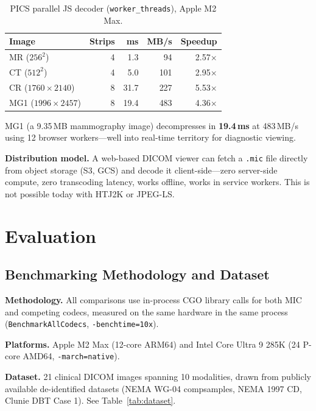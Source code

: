 \documentclass[journal]{IEEEtran}
\begin{document}
\begin{table}[htbp]
\centering
\caption{PICS parallel JS decoder (\texttt{worker\_threads}), Apple M2 Max.}
\label{tab:pics-js}
\begin{tabular}{lrrrr}
\toprule
Image & Strips & ms & MB/s & Speedup \\
\midrule
MR ($256^2$)       & 4 &  1.3 &  94 & 2.57$\times$ \\
CT ($512^2$)       & 4 &  5.0 & 101 & 2.95$\times$ \\
CR ($1760{\times}2140$) & 8 & 31.7 & 227 & 5.53$\times$ \\
MG1 ($1996{\times}2457$) & 8 & 19.4 & 483 & 4.36$\times$ \\
\bottomrule
\end{tabular}
\end{table}

MG1 (a 9.35\,MB mammography image) decompresses in \textbf{19.4\,ms} at
483\,MB/s using 12 browser workers---well into real-time territory for
diagnostic viewing.

\textbf{Distribution model.} A web-based DICOM viewer can fetch a \texttt{.mic}
file directly from object storage (S3, GCS) and decode it client-side---zero
server-side compute, zero transcoding latency, works offline, works in service
workers. This is not possible today with HTJ2K or JPEG-LS.

\section{Evaluation}
\label{sec:eval}

\subsection{Benchmarking Methodology and Dataset}

\textbf{Methodology.} All comparisons use in-process CGO library calls for both
MIC and competing codecs, measured on the same hardware in the same process
(\texttt{BenchmarkAllCodecs}, \texttt{-benchtime=10x}).

\textbf{Platforms.} Apple M2 Max (12-core ARM64) and Intel Core Ultra 9 285K
(24 P-core AMD64, \texttt{-march=native}).

\textbf{Dataset.} 21 clinical DICOM images spanning 10 modalities, drawn from
publicly available de-identified datasets (NEMA WG-04 compsamples, NEMA 1997
CD, Clunie DBT Case 1). See Table~\ref{tab:dataset}.
\end{document}
